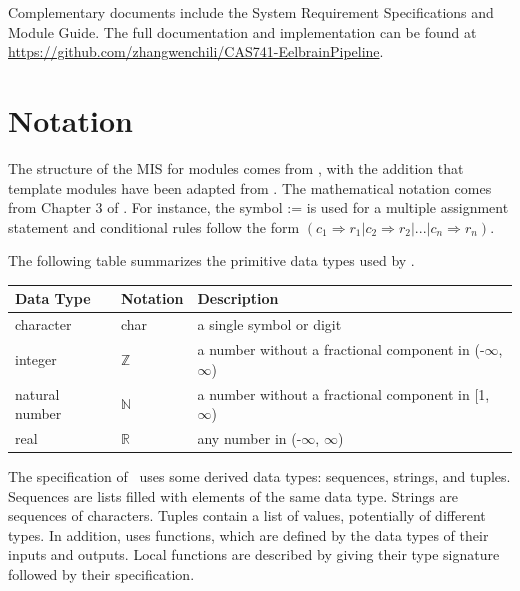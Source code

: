 \documentclass[12pt, titlepage]{article}
\begin{document}
Complementary documents include the System Requirement Specifications
and Module Guide.  The full documentation and implementation can be found at \url{https://github.com/zhangwenchili/CAS741-EelbrainPipeline}.








\section{Notation}


The structure of the MIS for modules comes from \citet{HoffmanAndStrooper1995}, with the addition that template modules have been adapted from \cite{GhezziEtAl2003}.  The mathematical notation comes from Chapter 3 of \citet{HoffmanAndStrooper1995}.  For instance, the symbol := is used for a multiple assignment statement and conditional rules follow the form $(c_1 \Rightarrow r_1 | c_2 \Rightarrow r_2 | ... | c_n \Rightarrow r_n )$.


The following table summarizes the primitive data types used by \progname{}. 


\begin{center}
\renewcommand{\arraystretch}{1.2}
\noindent 
\begin{tabular}{l l p{7.5cm}} 
\toprule 
\textbf{Data Type} & \textbf{Notation} & \textbf{Description}\\ 
\midrule
    character & char & a single symbol or digit\\
    integer & $\mathbb{Z}$ & a number without a fractional component in (-$\infty$, $\infty$) \\
    natural number & $\mathbb{N}$ & a number without a fractional component in [1, $\infty$) \\
    real & $\mathbb{R}$ & any number in (-$\infty$, $\infty$)\\
\bottomrule
\end{tabular} 
\end{center}


\noindent The specification of \progname{} \ uses some derived data types: sequences, strings, and tuples. Sequences are lists filled with elements of the same data type. Strings are sequences of characters. Tuples contain a list of values, potentially of different types. In addition, \progname{} uses functions, which are defined by the data types of their inputs and outputs. Local functions are described by giving their type signature followed by their specification.
\end{document}
